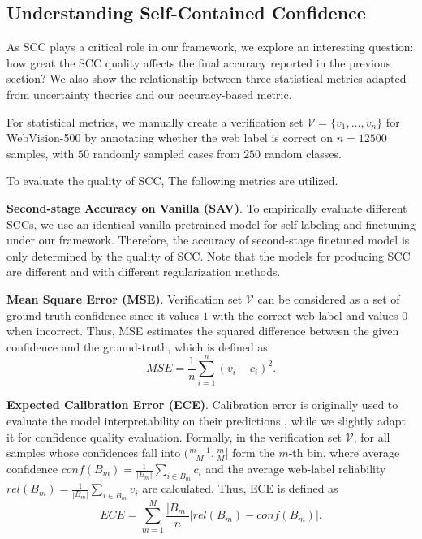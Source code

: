 \documentclass[runningheads]{llncs}
\begin{document}
\subsection{Understanding Self-Contained Confidence}
\label{S:exp-conf}
As SCC plays a critical role in our framework, we explore an interesting question: 
how great the SCC quality affects the final accuracy reported in the previous section? We also show the relationship between three statistical metrics adapted from uncertainty theories and our accuracy-based metric. 

For statistical metrics, we manually create a verification set $\mathcal{V}=\{v_1, \dots, v_n\}$ for WebVision-500 by annotating whether the web label is correct on $n=12500$ samples, with $50$ randomly sampled cases from $250$ random classes. 


To evaluate the quality of SCC, The following metrics are utilized.

\textbf{Second-stage Accuracy on Vanilla (SAV)}. 
To empirically evaluate different SCCs, we use an identical vanilla pretrained model for self-labeling and finetuning under our framework. Therefore, the accuracy of second-stage finetuned model is only determined by the quality of SCC. Note that the models for producing SCC are different and with different regularization methods.
	
\textbf{Mean Square Error (MSE)}. Verification set $\mathcal{V}$ can be considered as a set of ground-truth confidence since it values $1$ with the correct web label and values $0$ when incorrect. Thus, MSE estimates the squared difference between the given confidence and the ground-truth, which is defined as 
\begin{equation}
\label{E:mse}
\textit{MSE} = \frac{1}{n}\sum_{i=1}^{n}(v_i - c_i)^2.
\end{equation}

\textbf{Expected Calibration Error (ECE)}. Calibration error is originally used to evaluate the model interpretability on their predictions \cite{guo2017calibration}, while we slightly adapt it for confidence quality evaluation. 
Formally, in the verification set $\mathcal{V}$, for all samples whose confidences fall into $(\frac{m-1}{M},\frac{m}{M}]$ form the $m$-th bin, where average confidence $\textit{conf}(B_m)=\frac{1}{|B_m|}\sum_{i\in B_m}c_i$ and the average web-label reliability $\textit{rel}(B_m)=\frac{1}{|B_m|}\sum_{i\in B_m}v_i$ are calculated. Thus, ECE is defined as
\begin{equation}
\label{E:ece}
\textit{ECE} = \sum_{m=1}^{M}\frac{|B_m|}{n}\biggl|\textit{rel}(B_m) - \textit{conf}(B_m)\biggr|.
\end{equation}
\end{document}
